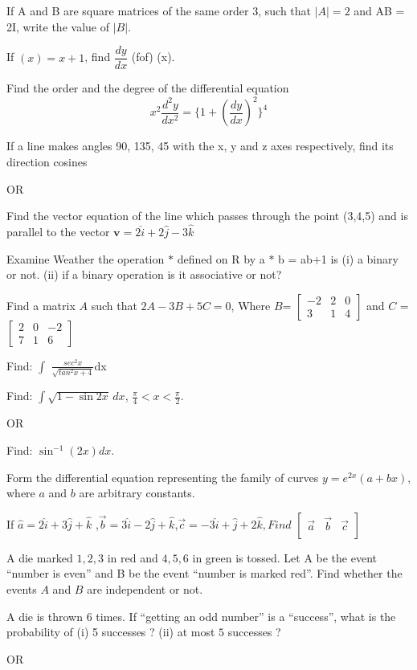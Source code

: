\documentclass{article}
\begin{document}
\begin{enumerate}
  
  \item If A and B are square matrices of the same order 3, such that $|A| = 2 $ and AB = 2I,
write the value of $|B|$.
  
 \item If $(x) = x + 1 $, find {$\dfrac{dy}{dx}$} (fof) (x).
 \item Find the order and the degree of the differential equation  \[x^{2}\frac{d^{2}y}{dx^{2}}=\{1+(\frac{dy}{dx})^{2}\}^{4}\]
\item If a line makes angles 90\degree{}, 135\degree{}, 45\degree{} with the x, y and z axes 
    respectively, find its direction cosines
\begin{center}
\item OR
\end{center}
\item Find the vector equation of the line which passes through the point 
    (3,4,5) and is parallel to the vector $\mathbf{v} = 2\hat{i} + 2\hat{j} - 3\hat{k}$
\item Examine Weather the operation $*$ defined on R by a $*$ b = ab+1 is (i) a binary or not.
\newline (ii) if a binary operation is it associative or not?
\item Find a matrix $A$ such that $2A - 3B + 5C = 0$, Where $B$= 
$\begin{bmatrix}    
    -2& 2  & 0 \\ 
     3 & 1 & 4
\end{bmatrix}$ and $C$ =
$\begin{bmatrix}
     2 & 0  & -2 \\ 
     7 & 1 & 6
\end{bmatrix}$
\item  Find: $\int$ $\frac{sec^2x}{\sqrt{tan^2x+4}}$dx
\item Find: $\int \sqrt{1-\sin 2x} \, dx$, $\frac{\pi}{4} < x < \frac{\pi}{2}$.
\begin{center}
    OR
\end{center}
\item Find: ${\sin^{-1}(2x)} dx.$
\item Form the differential equation representing the family of curves $y = e^{2x}(a + bx)$, where $a$ and $b$ are arbitrary constants.
\item If $\hat{a}=2\hat{i}+3\hat{j}+\hat{k}$ ,$\vec{b}=3\hat{i}-2\hat{j}+\hat{k}$,$\vec{c}=-3\hat{i}+\hat{j}+2\hat{k},Find$
$\begin{bmatrix}
    \Vec{a} & \vec{b} & \vec{c} \\
\end{bmatrix}$
\item A die marked $ 1, 2, 3$ in red and $4, 5, 6$ in green is tossed. Let A be the event “number is even” and B be the event “number is marked red”. Find whether the events $A$ and $B$
are independent or not.
\item A die is thrown $6$ times. If “getting an odd number” is a “success”, what is the
probability of (i) 5 successes ? (ii) at most $5$ successes ? 
\begin{center}
    OR
\end{center}



\end{enumerate}
\end{document}
